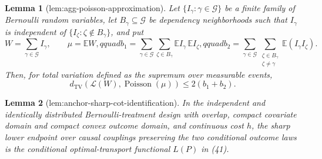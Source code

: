 \documentclass{article}
\newtheorem{lemma}{Lemma}
\begin{document}
\begin{lemma}[lem:agg-poisson-approximation]\label{lem:agg-poisson-approximation}
Let \(\{I_\gamma:\gamma\in\mathcal G\}\) be a finite family of Bernoulli random variables, let \(B_\gamma\subseteq\mathcal G\) be dependency neighborhoods such that \(I_\gamma\) is independent of \(\{I_\zeta:\zeta\notin B_\gamma\}\), and put
\[
 W=\sum_{\gamma\in\mathcal G}I_\gamma,\qquad
 \mu=\mathbb EW,qquad
 b_1=\sum_{\gamma\in\mathcal G}\sum_{\zeta\in B_\gamma}
       \mathbb EI_\gamma\,\mathbb EI_\zeta,qquad
 b_2=\sum_{\gamma\in\mathcal G}\sum_{\substack{\zeta\in B_\gamma\\\zeta\ne\gamma}}
       \mathbb E(I_\gamma I_\zeta).
\]
Then, for total variation defined as the supremum over measurable events,
\[
 d_{\mathrm{TV}}\!\left(\mathcal L(W),\operatorname{Poisson}(\mu)\right)
 \le 2(b_1+b_2).
\]
\end{lemma}

\begin{lemma}[lem:anchor-sharp-cot-identification]\label{lem:anchor-sharp-cot-identification}
In the independent and identically distributed Bernoulli-treatment design with overlap, compact covariate domain and compact convex outcome domain, and continuous cost \(h\), the sharp lower endpoint over causal couplings preserving the two conditional outcome laws is the conditional optimal-transport functional \(L(P)\) in (41).
\end{lemma}
\end{document}
